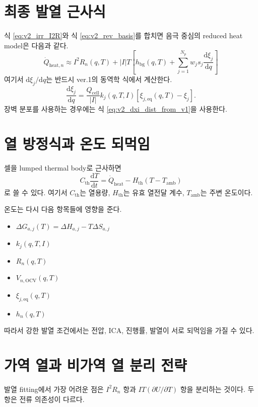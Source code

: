 \documentclass[11pt,a4paper]{article}
\newcommand{\dd}{\mathrm{d}}
\newcommand{\OCV}{\mathrm{OCV}}
\newcommand{\eq}{\mathrm{eq}}
\newcommand{\bg}{\mathrm{bg}}
\newcommand{\cell}{\mathrm{cell}}
\begin{document}
\section{최종 발열 근사식}
식 \eqref{eq:v2_irr_I2R}와 식 \eqref{eq:v2_rev_basis}를 합치면 음극 중심의 reduced heat model은 다음과 같다.
\begin{equation}
\boxed{
\dot Q_{\mathrm{heat},n}
\approx
I^2R_n(q,T)
+
|I|T\left[h_{\bg}(q,T)+\sum_{j=1}^{N_p}w_js_j\frac{\dd\xi_j}{\dd q}\right]
}
\label{eq:v2_heat_final}
\end{equation}
여기서 \(\dd\xi_j/\dd q\)는 반드시 ver.1의 동역학 식에서 계산한다.
\begin{equation}
\frac{\dd\xi_j}{\dd q}=\frac{Q_{\cell}}{|I|}k_j(q,T,I)\left[\xi_{j,\eq}(q,T)-\xi_j\right].
\label{eq:v2_heat_uses_dxi}
\end{equation}
장벽 분포를 사용하는 경우에는 식 \eqref{eq:v2_dxi_dist_from_v1}을 사용한다.

\section{열 방정식과 온도 되먹임}
셀을 lumped thermal body로 근사하면
\begin{equation}
C_{\mathrm{th}}\frac{\dd T}{\dd t}=\dot Q_{\mathrm{heat}}-H_{\mathrm{th}}\left(T-T_{\mathrm{amb}}\right)
\label{eq:v2_lumped_heat}
\end{equation}
로 쓸 수 있다. 여기서 \(C_{\mathrm{th}}\)는 열용량, \(H_{\mathrm{th}}\)는 유효 열전달 계수, \(T_{\mathrm{amb}}\)는 주변 온도이다.

온도는 다시 다음 항목들에 영향을 준다.
\begin{itemize}
\item \(\Delta G_{a,j}(T)=\Delta H_{a,j}-T\Delta S_{a,j}\)
\item \(k_j(q,T,I)\)
\item \(R_n(q,T)\)
\item \(V_{n,\OCV}(q,T)\)
\item \(\xi_{j,\eq}(q,T)\)
\item \(h_n(q,T)\)
\end{itemize}
따라서 강한 발열 조건에서는 전압, ICA, 진행률, 발열이 서로 되먹임을 가질 수 있다.

\section{가역 열과 비가역 열 분리 전략}
발열 fitting에서 가장 어려운 점은 \(I^2R_n\) 항과 \(IT(\partial U/\partial T)\) 항을 분리하는 것이다. 두 항은 전류 의존성이 다르다.
\end{document}
